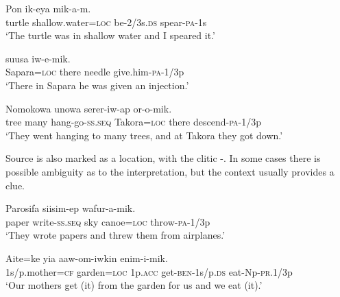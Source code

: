 \ea%
\label{ex:x856}
\gll Pon    ik-eya  mik-a-m. \\
     turtle  shallow.water=\textsc{loc}  be-2/3s.\textsc{ds}  spear-\textsc{pa}-1s \\
\glt`The turtle was in shallow water and I speared it.'
\z





\ea%
\label{ex:x857}
\gll {}   suusa  iw-e-mik. \\
   Sapara=\textsc{loc}  there  needle  give.him-\textsc{pa}-1/3p   \\
\glt`There in Sapara he was given an injection.'
\z





\ea%
\label{ex:x865}
\gll Nomokowa  unowa  serer-iw-ap    or-o-mik.\\
   tree  many  hang-go-\textsc{ss}.\textsc{seq}  Takora=\textsc{loc}  there  descend-\textsc{pa}-1/3p   \\
\glt`They went hanging to many trees, and at Takora they got down.'
\z









Source is also marked as a location, with the clitic -. In some cases there is possible ambiguity as to the interpretation, but the context usually provides a clue.

\ea%
\label{ex:x858}
\gll Parosifa  siisim-ep     wafur-a-mik. \\
   paper  write-\textsc{ss}.\textsc{seq}  sky  canoe=\textsc{loc}  throw-\textsc{pa}-1/3p   \\
\glt`They wrote papers and threw them from airplanes.'
\z





\ea%
\label{ex:x859}
\gll Aite=ke    yia  aaw-om-iwkin  enim-i-mik. \\
   1s/p.mother=\textsc{cf}  garden=\textsc{loc}  1p.\textsc{acc}  get-\textsc{ben}-1s/p.\textsc{ds}  eat-Np-\textsc{pr}.1/3p   \\
\glt`Our mothers get (it) from the garden for us and we eat (it).'
\z





